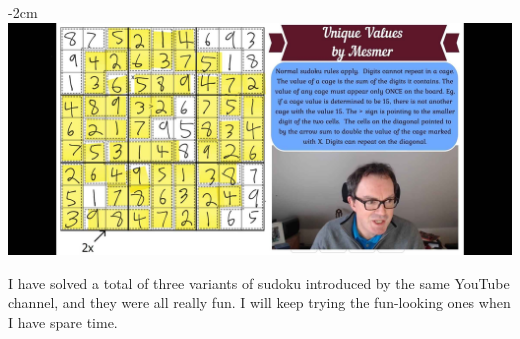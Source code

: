 \documentclass[12pt, oneside]{article}
\begin{document}
\begin{center}
\addtolength{\leftskip} {-2cm} %
\addtolength{\rightskip}{-2cm}
\includegraphics[scale=0.22]{puzzle2sln}
\end{center}
I have solved a total of three variants of sudoku introduced by the same YouTube channel, and they were all really fun. I will keep trying the fun-looking ones when I have spare time.
\end{document}
